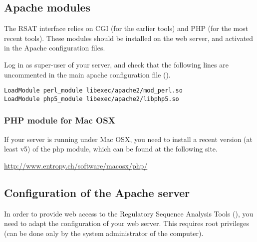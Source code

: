 \documentclass[12pt,a4paper, twoside]{scrreprt} %
\begin{document}
\subsection{Apache modules}

The RSAT interface relies on CGI (for the earlier tools) and PHP (for
the most recent tools). These modules should be installed on the web
server, and activated in the Apache configuration files. 

Log in as super-user of your server, and check that the following
lines are uncommented in the main apache configuration file
().

\begin{lstlisting}
LoadModule perl_module libexec/apache2/mod_perl.so
LoadModule php5_module libexec/apache2/libphp5.so
\end{lstlisting}
                                                        

\subsubsection{PHP module for Mac OSX}

If your server is running under Mac OSX, you need to install a recent
version (at least v5) of the php module, which can be found at the following site. 

\url{http://www.entropy.ch/software/macosx/php/}

\subsection{Configuration of the Apache server}

In order to provide web access to the Regulatory Sequence Analysis
Tools (\RSAT), you need to adapt the configuration of your web
server. This requires root privileges (can be done only by the system
administrator of the computer).
\end{document}
